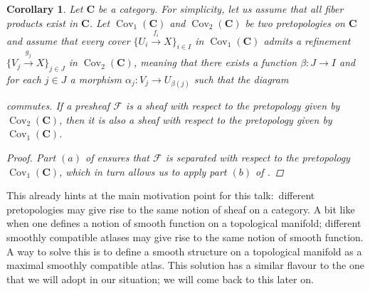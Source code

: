 \documentclass[12pt,a4paper]{amsart}
\theoremstyle{plain}
\newtheorem{cor}[thm]{Corollary}
\theoremstyle{definition}
\theoremstyle{remark}
\begin{document}
\begin{cor}\label{cor:refinement}
  Let $\mathbf{C}$ be a category.
  For simplicity, let us assume that all fiber products exist in $\mathbf{C}$.
  Let $\operatorname{Cov}_{1}(\mathbf{C})$ and $\operatorname{Cov}_{2}(\mathbf{C})$ be two pretopologies on $\mathbf{C}$ and assume that every cover $\{ U_{i} \xrightarrow{f_{i}} X \}_{i \in I}$ in $\operatorname{Cov}_{1}(\mathbf{C})$ admits a refinement $\{ V_{j} \xrightarrow{g_{j}} X \}_{j \in J}$ in $\operatorname{Cov}_{2}(\mathbf{C})$, meaning that there exists a function $\beta \colon J \to I$ and for each $j \in J$ a morphism $\alpha_{j} \colon V_{j} \to U_{\beta(j)}$ such that the diagram
  \begin{center}
  \end{center}
  commutes.
  If a presheaf $\mathscr{F}$ is a sheaf with respect to the pretopology given by $\operatorname{Cov}_{2}(\mathbf{C})$, then it is also a sheaf with respect to the pretopology given by $\operatorname{Cov}_{1}(\mathbf{C})$.
  \begin{proof}
    Part $(a)$ of  ensures that $\mathscr{F}$ is separated with respect to the pretopology $\operatorname{Cov}_{1}(\mathbf{C})$, which in turn allows us to apply part $(b)$ of .
  \end{proof}
\end{cor}

This already hints at the main motivation point for this talk:~different pretopologies may give rise to the same notion of sheaf on a category.
A bit like when one defines a notion of smooth function on a topological manifold; different smoothly compatible atlases may give rise to the same notion of smooth function.
A way to solve this is to define a smooth structure on a topological manifold as a maximal smoothly compatible atlas.
This solution has a similar flavour to the one that we will adopt in our situation; we will come back to this later on.
\end{document}
